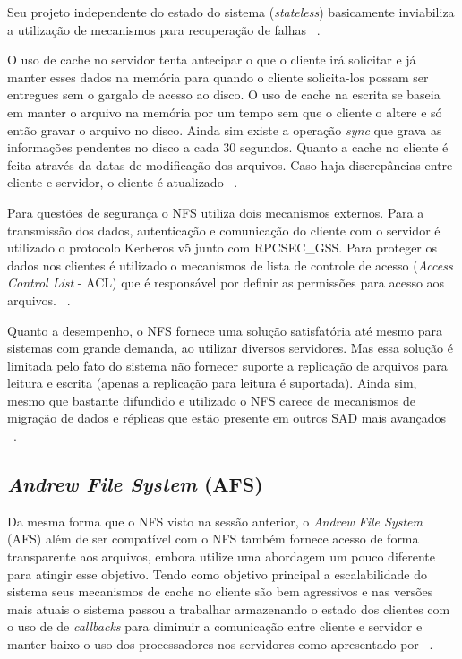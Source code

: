     Seu projeto independente do estado do sistema (\textit{stateless}) basicamente inviabiliza a utilização de mecanismos para recuperação de falhas ~\cite{coulouris}.
    
    O uso de cache no servidor tenta antecipar o que o cliente irá solicitar e já manter esses dados na memória para quando o cliente solicita-los possam ser entregues sem o gargalo de acesso ao disco. O uso de cache na escrita se baseia em manter o arquivo na memória por um tempo sem que o cliente o altere e só então gravar o arquivo no disco. Ainda sim existe a operação \textit{sync} que grava as informações pendentes no disco a cada 30 segundos.
    Quanto a cache no cliente é feita através da datas de modificação dos arquivos. Caso haja discrepâncias entre cliente e servidor, o cliente é atualizado ~\cite{coulouris}.
    
    Para questões de segurança o NFS utiliza dois mecanismos externos. Para a transmissão dos dados, autenticação e comunicação do cliente com o servidor é utilizado o protocolo Kerberos v5 junto com RPCSEC\_GSS. Para proteger os dados nos clientes é utilizado o mecanismos de lista de controle de acesso (\textit{Access Control List} - ACL) que é responsável por definir as permissões para acesso aos arquivos. ~\cite{tanenbaum}.
    
    Quanto a desempenho, o NFS fornece uma solução satisfatória até mesmo para sistemas com grande demanda, ao utilizar diversos servidores. Mas essa solução é limitada pelo fato do sistema não fornecer suporte a replicação de arquivos para leitura e escrita (apenas a replicação para leitura é suportada). Ainda sim, mesmo que bastante difundido e utilizado o NFS carece de mecanismos de migração de dados e réplicas que estão presente em outros SAD mais avançados ~\cite{coulouris}.
    
    \subsection{\textit{Andrew File System} (AFS)}
    
    Da mesma forma que o NFS visto na sessão anterior, o \textit{Andrew File System} (AFS) além de ser compatível com o NFS também fornece acesso de forma transparente aos arquivos, embora utilize uma abordagem um pouco diferente para atingir esse objetivo. Tendo como objetivo principal a escalabilidade do sistema seus mecanismos de cache no cliente são bem agressivos e nas versões mais atuais o sistema passou a trabalhar armazenando o estado dos clientes com o uso de de \textit{callbacks} para diminuir a comunicação entre cliente e servidor e manter baixo o uso dos processadores nos servidores como apresentado por ~\cite{coulouris}.
    
